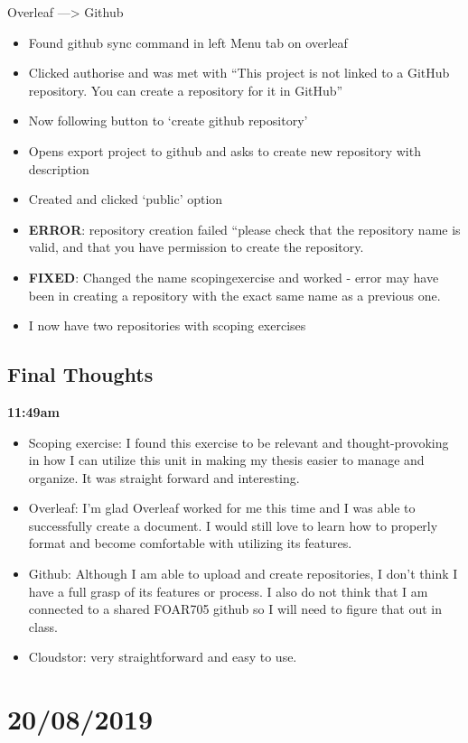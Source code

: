 \documentclass{article}
\begin{document}
\begin{itemize}
Overleaf —> Github

\begin{itemize}
\item Found github sync command in left Menu tab on overleaf
\item Clicked authorise and was met with “This project is not linked to a GitHub repository. You can create a repository for it in GitHub”
\item Now following button to ‘create github repository’
\item Opens export project to github and asks to create new repository with description
\item Created and clicked ‘public’ option
\item \textbf{ERROR}: repository creation failed “please check that the repository name is valid,  and that you have permission to create the repository.
\item \textbf{FIXED}: Changed the name scopingexercise and worked - error may have been in creating a repository with the exact same name as a previous one.
\item I now have two repositories with scoping exercises
\end{itemize}

\subsection{Final Thoughts}

\textbf{11:49am}

\begin{itemize}
\item Scoping exercise: I found this exercise to be relevant and thought-provoking in how I can utilize this unit in making my thesis easier to manage and organize. It was straight forward and interesting. 
\item Overleaf: I’m glad Overleaf worked for me this time and I was able to successfully create a document. I would still love to learn how to properly format and become comfortable with utilizing its features. 
\item Github: Although I am able to upload and create repositories, I don’t think I have a full grasp of its features or process. I also do not think that I am connected to a shared FOAR705 github so I will need to figure that out in class.
\item Cloudstor: very straightforward and easy to use.
\end{itemize}

\section{20/08/2019}

\end{itemize}
\end{document}

